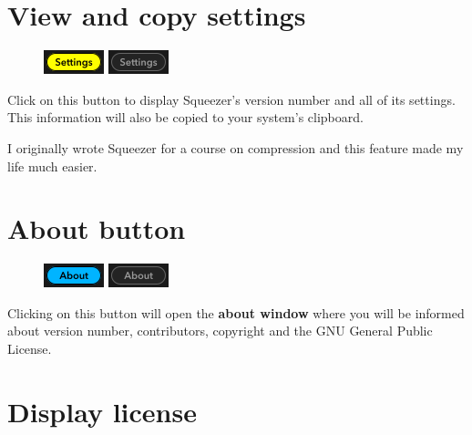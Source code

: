 \section{View and copy settings}

\begin{figure}
  \includegraphics[scale=\screenshotscale,clip]{include/images/button_settings_on.png}
  \newline \vspace{-0.9\baselineskip}
  \includegraphics[scale=\screenshotscale,clip]{include/images/button_settings_off.png}
\end{figure}

Click on this button to display Squeezer's version number and all of
its settings.  This information will also be copied to your system's
clipboard.

I originally wrote Squeezer for a course on compression and this
feature made my life much easier.

\section{About button}

\begin{figure}
  \includegraphics[scale=\screenshotscale,clip]{include/images/button_about_on.png}
  \newline \vspace{-0.9\baselineskip}
  \includegraphics[scale=\screenshotscale,clip]{include/images/button_about_off.png}
\end{figure}

Clicking on this button will open the \textbf{about window} where you
will be informed about version number, contributors, copyright and the
GNU General Public License.

\section{Display license}

